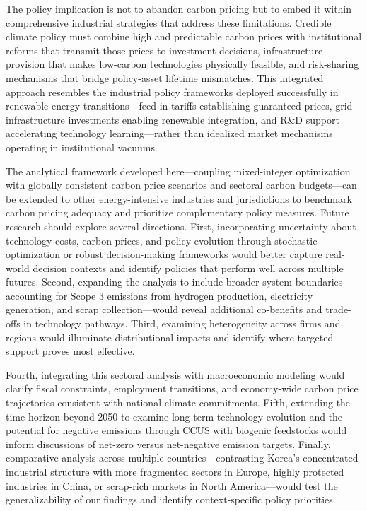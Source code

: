 \documentclass[preprint,1p,authoryear]{elsarticle}
\begin{document}
The policy implication is not to abandon carbon pricing but to embed it within comprehensive industrial strategies that address these limitations. Credible climate policy must combine high and predictable carbon prices with institutional reforms that transmit those prices to investment decisions, infrastructure provision that makes low-carbon technologies physically feasible, and risk-sharing mechanisms that bridge policy-asset lifetime mismatches. This integrated approach resembles the industrial policy frameworks deployed successfully in renewable energy transitions—feed-in tariffs establishing guaranteed prices, grid infrastructure investments enabling renewable integration, and R\&D support accelerating technology learning—rather than idealized market mechanisms operating in institutional vacuums.

The analytical framework developed here—coupling mixed-integer optimization with globally consistent carbon price scenarios and sectoral carbon budgets—can be extended to other energy-intensive industries and jurisdictions to benchmark carbon pricing adequacy and prioritize complementary policy measures. Future research should explore several directions. First, incorporating uncertainty about technology costs, carbon prices, and policy evolution through stochastic optimization or robust decision-making frameworks would better capture real-world decision contexts and identify policies that perform well across multiple futures. Second, expanding the analysis to include broader system boundaries—accounting for Scope 3 emissions from hydrogen production, electricity generation, and scrap collection—would reveal additional co-benefits and trade-offs in technology pathways. Third, examining heterogeneity across firms and regions would illuminate distributional impacts and identify where targeted support proves most effective.

Fourth, integrating this sectoral analysis with macroeconomic modeling would clarify fiscal constraints, employment transitions, and economy-wide carbon price trajectories consistent with national climate commitments. Fifth, extending the time horizon beyond 2050 to examine long-term technology evolution and the potential for negative emissions through CCUS with biogenic feedstocks would inform discussions of net-zero versus net-negative emission targets. Finally, comparative analysis across multiple countries—contrasting Korea's concentrated industrial structure with more fragmented sectors in Europe, highly protected industries in China, or scrap-rich markets in North America—would test the generalizability of our findings and identify context-specific policy priorities.
\end{document}
